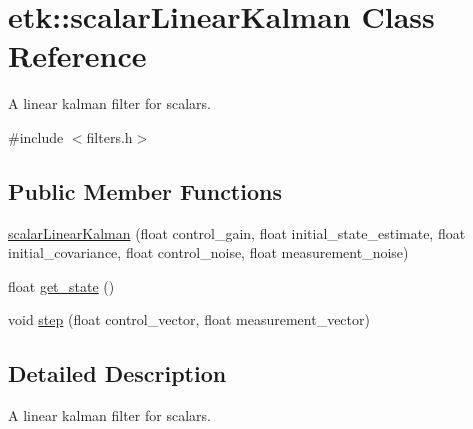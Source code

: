 \hypertarget{classetk_1_1scalar_linear_kalman}{\section{etk\-:\-:scalar\-Linear\-Kalman Class Reference}
\label{classetk_1_1scalar_linear_kalman}
}


A linear kalman filter for scalars.  




{\ttfamily \#include $<$filters.\-h$>$}

\subsection*{Public Member Functions}
\begin{DoxyCompactItemize}
\item 
\hyperlink{classetk_1_1scalar_linear_kalman_a7baecda5b4de461221b2808a54d5035c}{scalar\-Linear\-Kalman} (float control\-\_\-gain, float initial\-\_\-state\-\_\-estimate, float initial\-\_\-covariance, float control\-\_\-noise, float measurement\-\_\-noise)
\item 
float \hyperlink{classetk_1_1scalar_linear_kalman_a51e1bc132ce95a177cc7007f6ec5a208}{get\-\_\-state} ()
\item 
void \hyperlink{classetk_1_1scalar_linear_kalman_ab402931c47fec628685d4407102b73f1}{step} (float control\-\_\-vector, float measurement\-\_\-vector)
\end{DoxyCompactItemize}


\subsection{Detailed Description}
A linear kalman filter for scalars. 

